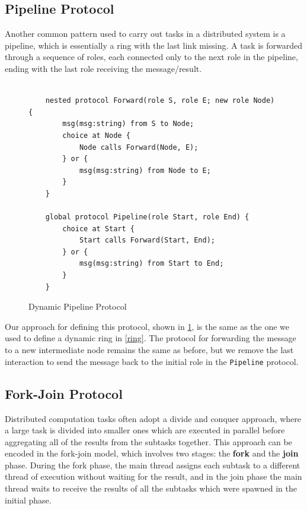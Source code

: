 \documentclass[12pt,twoside]{report}
\begin{document}
\subsection{Pipeline Protocol}\label{pipeline}

Another common pattern used to carry out tasks in a distributed system is a pipeline, which is essentially a ring with the last link missing. A task is forwarded through a sequence of roles, each connected only to the next role in the pipeline, ending with the last role receiving the message/result.

\begin{figure}[htb!]
    \centering
    \lstset{language=Scribble}
    \begin{lstlisting}
    
    nested protocol Forward(role S, role E; new role Node) {
        msg(msg:string) from S to Node;
        choice at Node {
            Node calls Forward(Node, E);
        } or {
            msg(msg:string) from Node to E;
        }
    }
        
    global protocol Pipeline(role Start, role End) {
        choice at Start {
            Start calls Forward(Start, End);
        } or {
            msg(msg:string) from Start to End;
        }
    }
    \end{lstlisting}
    \caption{Dynamic Pipeline Protocol}
    \label{pipeline-protocol}
\end{figure}{}


Our approach for defining this protocol, shown in \ref{pipeline-protocol}, is the same as the one we used to define a dynamic ring in \ref{ring}. The protocol for forwarding the message to a new intermediate node remains the same as before, but we remove the last interaction to send the message back to the initial role in the \texttt{Pipeline} protocol.

\subsection{Fork-Join Protocol}\label{forkjoin}
Distributed computation tasks often adopt a divide and conquer approach, where a large task is divided into smaller ones which are executed in parallel before aggregating all of the results from the subtasks together. This approach can be encoded in the fork-join model, which involves two stages: the \textbf{fork} and the \textbf{join} phase. During the fork phase, the main thread assigns each subtask to a different thread of execution without waiting for the result, and in the join phase the main thread waits to receive the results of all the subtasks which were spawned in the initial phase.\\
\end{document}
